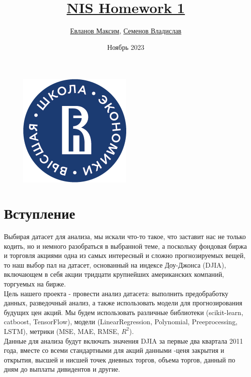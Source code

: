 \documentclass{article}
\begin{document}
\begin{titlepage}
\title{\href{https://github.com/Menako778/NIS_DJI}{\Huge NIS Homework 1}}
\author{
    \href{https://t.me/styleliferock}{Евланов Максим}, 
    \href{https://t.me/shervonemes}{Семенов Владислав}
}
\begin{figure}
    \centering
    \includegraphics[width=4 cm]{01_Logo_HSE_full_rus_Pantone.png}
\end{figure}
\date{\vspace{0cm} Ноябрь 2023}
\end{titlepage}

\maketitle

\tableofcontents{\vspace{3cm}}
\newpage
\section{Вступление}


Выбирая датасет для анализа, мы искали что-то такое, что заставит нас не только кодить, но и немного разобраться в выбранной теме, а поскольку фондовая биржа и торговля акциями одна из самых интересный и сложно прогнозируемых вещей, то наш выбор пал на датасет, основанный на индексе Доу-Джонса (DJIA), включающем в себя акции тридцати крупнейших американских компаний, торгуемых на бирже.
\\

Цель нашего проекта - провести анализ датасета: выполнить предобработку данных, разведочный анализ, а также использовать модели для прогнозирования будущих цен акций. Мы будем использовать различные библиотеки (scikit-learn, catboost, TensorFlow), модели (LinearRegression, Polynomial, Preeprocessing, LSTM), метрики (MSE, MAE, RMSE, $R^2$).
\\

Данные для анализа будут включать значения DJIA за первые два квартала 2011 года, вместе со всеми стандартными для акций данными -ценя закрытия и открытия, высшей и нисшей точек дневных торгов, объема торгов, данный по дням до выплаты дивидентов и другие.
\\
\end{document}
